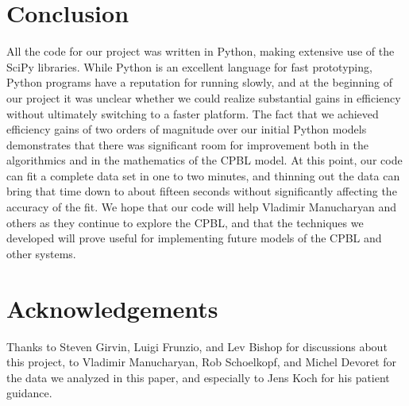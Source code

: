\documentclass[twocolumn]{revtex4}
\begin{document}
\section{Conclusion}
All the code for our project was written in Python, making extensive
use of the SciPy libraries. While Python is an excellent language for
fast prototyping, Python programs have a reputation for running
slowly, and at the beginning of our project it was unclear whether we
could realize substantial gains in efficiency without ultimately
switching to a faster platform. The fact that we achieved efficiency
gains of two orders of magnitude over our initial Python models
demonstrates that there was significant room for improvement both in
the algorithmics and in the mathematics of the CPBL model. At this
point, our code can fit a complete data set in one to two minutes, and
thinning out the data can bring that time down to about fifteen
seconds without significantly affecting the accuracy of the fit. We
hope that our code will help Vladimir Manucharyan and others as they
continue to explore the CPBL, and that the techniques we developed
will prove useful for implementing future models of the CPBL and other
systems.

\section{Acknowledgements}
Thanks to Steven Girvin, Luigi Frunzio, and Lev Bishop for discussions
about this project, to Vladimir Manucharyan, Rob Schoelkopf, and
Michel Devoret for the data we analyzed in this paper, and especially
to Jens Koch for his patient guidance.
\end{document}
